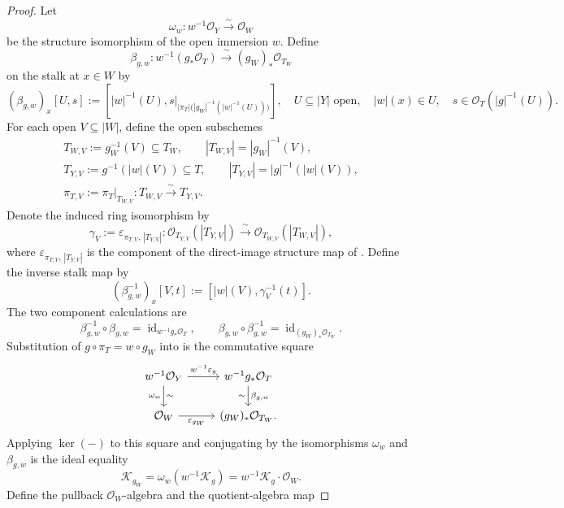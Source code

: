 \begin{proof}
  Let
  \[
    \omega_w\colon w^{-1}\mathcal O_Y\xrightarrow{\ \sim\ }\mathcal O_W
  \]
  be the structure isomorphism of the open immersion $w$.  Define
  \[
    \beta_{g,w}\colon w^{-1}(g_*\mathcal O_T)
      \xrightarrow{\ \sim\ }(g_W)_*\mathcal O_{T_W}
  \]
  on the stalk at $x\in W$ by
  \[
    (\beta_{g,w})_x[U,s]
      :=\left[|w|^{-1}(U),
        s|_{|\pi_T|\bigl(|g_W|^{-1}(|w|^{-1}(U))\bigr)}\right],
    \quad
    U\subseteq |Y|\text{ open},\quad |w|(x)\in U,
    \quad s\in\mathcal O_T(|g|^{-1}(U)).
  \]
  For each open $V\subseteq|W|$, define the open subschemes
  \[
  \begin{gathered}
    T_{W,V}:=g_W^{-1}(V)\subseteq T_W,\qquad
    |T_{W,V}|=|g_W|^{-1}(V),\\
    T_{Y,V}:=g^{-1}(|w|(V))\subseteq T,\qquad
    |T_{Y,V}|=|g|^{-1}(|w|(V)),\\
    \pi_{T,V}:=\pi_T|_{T_{W,V}}\colon
      T_{W,V}\xrightarrow{\ \sim\ }T_{Y,V}.
  \end{gathered}
  \]
  Denote the induced ring isomorphism by
  \[
    \gamma_V:=
      \varepsilon_{\pi_{T,V},\,|T_{Y,V}|}\colon
      \mathcal O_{T_{Y,V}}(|T_{Y,V}|)\xrightarrow{\ \sim\ }
      \mathcal O_{T_{W,V}}(|T_{W,V}|),
  \]
  where $\varepsilon_{\pi_{T,V},\,|T_{Y,V}|}$ is the component of
  the direct-image structure map of
  .  Define the inverse stalk
  map by
  \[
    (\beta_{g,w}^{-1})_x[V,t]
      :=[|w|(V),\gamma_V^{-1}(t)].
  \]
  The two component calculations are
  \[
    \beta_{g,w}^{-1}\circ\beta_{g,w}
      =\operatorname{id}_{w^{-1}g_*\mathcal O_T},
    \qquad
    \beta_{g,w}\circ\beta_{g,w}^{-1}
      =\operatorname{id}_{(g_W)_*\mathcal O_{T_W}}.
  \]
  Substitution of $g\circ\pi_T=w\circ g_W$ into
   is the commutative square
  \[
  \begin{tikzcd}
    w^{-1}\mathcal O_Y
      \arrow[r,"w^{-1}\varepsilon_g"] \arrow[d,"\omega_w"',"\sim"] &
    w^{-1}g_*\mathcal O_T \arrow[d,"\beta_{g,w}","\sim"']\\
    \mathcal O_W \arrow[r,"\varepsilon_{g_W}"'] &
    (g_W)_*\mathcal O_{T_W}.
  \end{tikzcd}
  \]
  Applying $\ker(-)$ to this square and conjugating by the isomorphisms
  $\omega_w$ and $\beta_{g,w}$ is the ideal equality
  \[
    \mathcal K_{g_W}
      =\omega_w(w^{-1}\mathcal K_g)
      =w^{-1}\mathcal K_g\cdot\mathcal O_W.
  \]
  Define the pullback $\mathcal O_W$-algebra and the quotient-algebra map

\end{proof}
